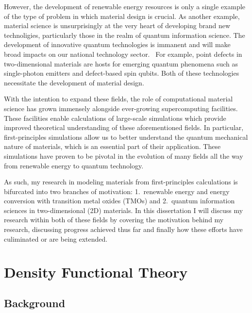 However, the development of renewable energy resources is only a single example of the type of problem in which material design is crucial. As another example, material science is unsurprisingly at the very heart of developing brand new technoligies, particularly those in the realm of quantum information science. The development of innovative quantum technologies is immanent and will make broad impacts on our national technology sector.~\cite{quantum} For example, point defects in two-dimensional materials are hosts for emerging quantum phenomena such as single-photon emitters and defect-based spin qubits. Both of these technologies necessitate the development of material design.

With the intention to expand these fields, the role of computational material science has grown immensely alongside ever-growing supercomputing facilities. These facilities enable calculations of large-scale simulations which provide improved theoretical understanding of these aforementioned fields. In particular, first-principles simulations allow us to better understand the quantum mechanical nature of materials, which is an essential part of their application. These simulations have proven to be pivotal in the evolution of many fields all the way from renewable energy to quantum technology.

As such, my research in modeling materials from first-principles calculations is bifurcated into two branches of motivation: 1.\ renewable energy and energy conversion with transition metal oxides (TMOs) and 2.\ quantum information sciences in two-dimensional (2D) materials. In this dissertation I will discuss my research within both of these fields by covering the motivation behind my research, discussing progress achieved thus far and finally how these efforts have culiminated or are being extended.



\section{Density Functional Theory}

\subsection{Background}

